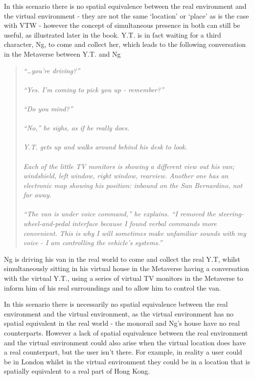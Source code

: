 In this scenario there is no spatial equivalence between the real environment and the virtual environment - they are not the same `location' or `place' as is the case with VTW - however the concept of simultaneous presence in both can still be useful, as illustrated later in the book. Y.T. is in fact waiting for a third character, Ng, to come and collect her, which leads to the following conversation in the Metaverse between Y.T. and Ng

\begin{quote}
\textit{``\ldots you're driving?''}
\\
\\
\textit{``Yes. I'm coming to pick you up - remember?''}
\\
\\
\textit{``Do you mind?''}
\\
\\
\textit{``No,'' he sighs, as if he really does.}
\\
\\
\textit{Y.T. gets up and walks around behind his desk to look.}
\\
\\
\textit{Each of the little TV monitors is showing a different view out his van; windshield,  left  window,  right  window, rearview.  Another  one  has  an electronic map  showing his position: inbound on the San Bernardino, not far
away.}
\\
\\
\textit{``The  van  is  under  voice  command,''  he  explains.  ``I  removed  the steering-wheel-and-pedal  interface because  I found  verbal  commands  more convenient. This  is why I will  sometimes  make unfamiliar  sounds with  my voice - I am controlling the vehicle's systems.''}
\end{quote}

Ng is driving his van in the real world to come and collect the real Y.T, whilst simultaneously sitting in his virtual house in the Metaverse having a conversation with the virtual Y.T., using a series of virtual TV monitors in the Metaverse to inform him of his real surroundings and to allow him to control the van.

In this scenario there is necessarily no spatial equivalence between the real environment and the virtual environment, as the virtual environment has no spatial equivalent in the real world - the monorail and Ng's house have no real counterparts. However a lack of spatial equivalence between the real environment and the virtual environment could also arise when the virtual location does have a real counterpart, but the user isn't there. For example, in reality a user could be in London whilst in the virtual environment they could be in a location that is spatially equivalent to a real part of Hong Kong.


